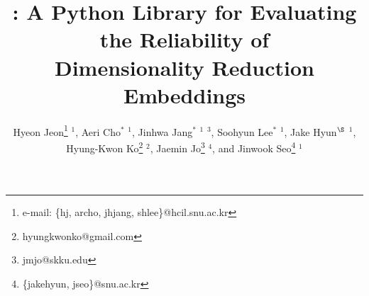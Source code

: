 \documentclass{vgtc}                          %
\title{\textit{\library}: A Python Library for Evaluating the Reliability of \\ Dimensionality Reduction Embeddings}
\author{
    Hyeon Jeon\thanks{e-mail: \{hj, archo, jhjang, shlee\}@hcil.snu.ac.kr} { }$^1$, %
    Aeri Cho$^*${ }$^1$,
    Jinhwa Jang$^*${ }$^1${ }$^3$,
    Soohyun Lee$^*${ }$^1$,
    Jake Hyun$^\S${ }$^1$, \\
    Hyung-Kwon Ko\thanks{hyungkwonko@gmail.com} { }$^2$,
    Jaemin Jo\thanks{jmjo@skku.edu} { }$^4$, and
    Jinwook Seo\thanks{\{jakehyun, jseo\}@snu.ac.kr} { }$^1$ 
    }
\affiliation{\scriptsize $^1$Seoul National University \quad $^2$KAIST \quad $^3$Samsung Electronics \quad $^4$Sungkyunkwan University}
\begin{document}
\def\sectionautorefname{Section}
\def\subsectionautorefname{Section}
\def\subsubsectionautorefname{Section}

\maketitle












\end{document}
